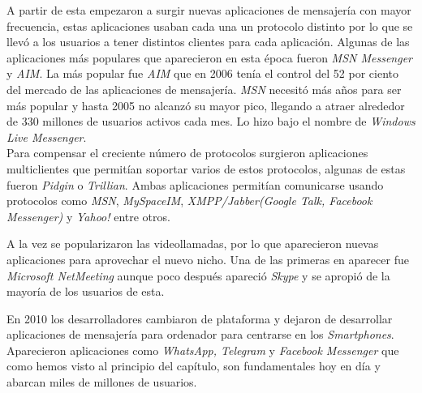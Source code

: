 A partir de esta empezaron a surgir nuevas aplicaciones de mensajería con mayor frecuencia, estas aplicaciones usaban cada una un protocolo distinto por lo que se llevó a los usuarios a tener distintos clientes para cada aplicación.
Algunas de las aplicaciones más populares que aparecieron en esta época fueron \emph{MSN Messenger} y \emph{AIM}. La más popular fue \emph{AIM} que en 2006 tenía el control del 52 por ciento del mercado de las aplicaciones de mensajería. \emph{MSN} necesitó más años para ser más popular y hasta 2005 no alcanzó su mayor pico, llegando a atraer alrededor de 330 millones de usuarios activos cada mes. Lo hizo bajo el nombre de \emph{Windows Live Messenger}.\\ 
Para compensar el creciente número de protocolos surgieron aplicaciones multiclientes que permitían soportar varios de estos protocolos, algunas de estas fueron \emph{Pidgin} o \emph{Trillian}. Ambas aplicaciones permitían comunicarse usando protocolos como \emph{MSN}, \emph{MySpaceIM}, \emph{XMPP/Jabber(Google Talk, Facebook Messenger)} y \emph{Yahoo!} entre otros. 

A la vez se popularizaron las videollamadas, por lo que aparecieron nuevas aplicaciones para aprovechar el nuevo nicho. Una de las primeras en aparecer fue \emph{Microsoft NetMeeting} aunque poco después apareció \emph{Skype} y se apropió de la mayoría de los usuarios de esta.

En 2010 los desarrolladores cambiaron de plataforma y dejaron de desarrollar aplicaciones de mensajería para ordenador para centrarse en los \emph{Smartphones}. Aparecieron aplicaciones como \emph{WhatsApp, Telegram} y \emph{Facebook Messenger} que como hemos visto al principio del capítulo, son fundamentales hoy en día y abarcan miles de millones de usuarios.

